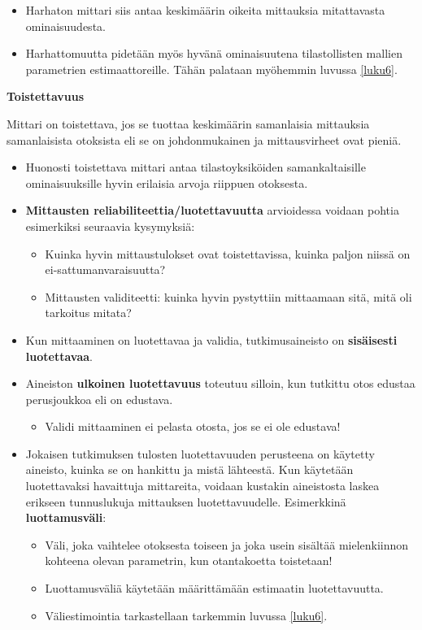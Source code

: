 \documentclass[
]{book}
\providecommand{\tightlist}{%
  \setlength{\itemsep}{0pt}\setlength{\parskip}{0pt}}
\begin{document}
\begin{itemize}
\item
  Harhaton mittari siis antaa keskimäärin oikeita mittauksia mitattavasta ominaisuudesta.
\item
  Harhattomuutta pidetään myös hyvänä ominaisuutena tilastollisten mallien parametrien estimaattoreille. Tähän palataan myöhemmin luvussa \ref{luku6}.
\end{itemize}

\begin{defblock}{}
\textbf{Toistettavuus}

Mittari on toistettava, jos se tuottaa keskimäärin samanlaisia mittauksia samanlaisista otoksista eli se on johdonmukainen ja mittausvirheet ovat pieniä.

\end{defblock}

\begin{itemize}
\item
  Huonosti toistettava mittari antaa tilastoyksiköiden samankaltaisille ominaisuuksille hyvin erilaisia arvoja riippuen otoksesta.
\item
  \textbf{Mittausten reliabiliteettia/luotettavuutta} arvioidessa voidaan pohtia esimerkiksi seuraavia kysymyksiä:

  \begin{itemize}
  \tightlist
  \item
    Kuinka hyvin mittaustulokset ovat toistettavissa, kuinka paljon niissä on ei-sattumanvaraisuutta?
  \item
    Mittausten validiteetti: kuinka hyvin pystyttiin mittaamaan sitä, mitä oli tarkoitus mitata?
  \end{itemize}
\item
  Kun mittaaminen on luotettavaa ja validia, tutkimusaineisto on \textbf{sisäisesti luotettavaa}.
\item
  Aineiston \textbf{ulkoinen luotettavuus} toteutuu silloin, kun tutkittu otos edustaa perusjoukkoa eli on edustava.

  \begin{itemize}
  \tightlist
  \item
    Validi mittaaminen ei pelasta otosta, jos se ei ole edustava!
  \end{itemize}
\item
  Jokaisen tutkimuksen tulosten luotettavuuden perusteena on käytetty aineisto, kuinka se on hankittu ja mistä lähteestä. Kun käytetään luotettavaksi havaittuja mittareita, voidaan kustakin aineistosta laskea erikseen tunnuslukuja mittauksen luotettavuudelle. Esimerkkinä \textbf{luottamusväli}:

  \begin{itemize}
  \tightlist
  \item
    Väli, joka vaihtelee otoksesta toiseen ja joka usein sisältää mielenkiinnon kohteena olevan parametrin, kun otantakoetta toistetaan!
  \item
    Luottamusväliä käytetään määrittämään estimaatin luotettavuutta.
  \item
    Väliestimointia tarkastellaan tarkemmin luvussa \ref{luku6}.
  \end{itemize}
\end{itemize}
\end{document}
